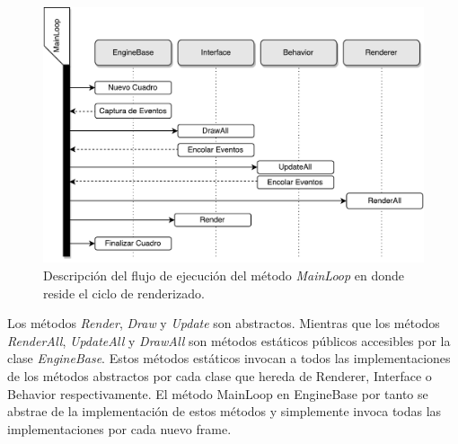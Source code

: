 \begin{figure}[H]
	\centering
	\captionsetup{justification=centering}
	\includegraphics[width=\linewidth]{media/mainloopflow.pdf}
	\caption{Descripción del flujo de ejecución del método \emph{MainLoop} en donde reside el ciclo de renderizado.}
\end{figure}

Los métodos \emph{Render}, \emph{Draw} y \emph{Update} son abstractos. Mientras que los métodos \emph{RenderAll}, \emph{UpdateAll} y \emph{DrawAll} son métodos estáticos públicos accesibles por la clase \emph{EngineBase}. Estos métodos estáticos invocan a todos las implementaciones de los métodos abstractos por cada clase que hereda de Renderer, Interface o Behavior respectivamente. El método MainLoop en EngineBase por tanto se abstrae de la implementación de estos métodos y simplemente invoca todas las implementaciones por cada nuevo frame.

